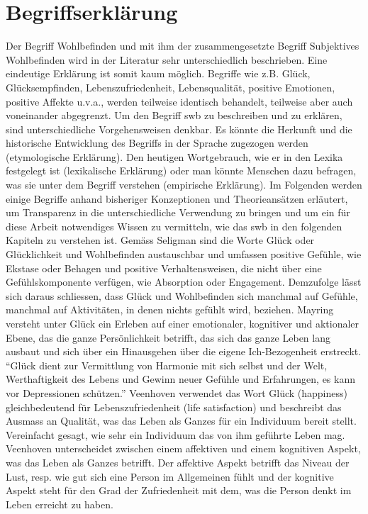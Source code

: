 \section{Begriffserklärung}\label{begriff}
Der Begriff Wohlbefinden und mit ihm der zusammengesetzte Begriff Subjektives Wohlbefinden wird in der Literatur sehr unterschiedlich beschrieben. Eine eindeutige Erklärung ist somit kaum möglich. Begriffe wie z.B. Glück, Glücksempfinden, Lebenszufriedenheit, Lebensqualität, positive Emotionen, positive Affekte u.v.a., werden teilweise identisch behandelt, teilweise aber auch voneinander abgegrenzt. Um den Begriff \gls{swb} zu beschreiben und zu erklären, sind unterschiedliche Vorgehensweisen denkbar. Es könnte die Herkunft und die historische Entwicklung des Begriffs in der Sprache zugezogen werden (etymologische Erklärung). Den heutigen Wortgebrauch, wie er in den Lexika festgelegt ist (lexikalische Erklärung) oder man könnte Menschen dazu befragen, was sie unter dem Begriff verstehen (empirische Erklärung). 
Im Folgenden werden einige Begriffe anhand bisheriger Konzeptionen und Theorieansätzen erläutert, um Transparenz in die unterschiedliche Verwendung zu bringen und um ein für diese Arbeit notwendiges Wissen zu vermitteln, wie das \gls{swb} in den folgenden Kapiteln zu verstehen ist.\newline
Gemäss Seligman  \cite{Seligman:2003} sind die Worte Glück oder Glücklichkeit und Wohlbefinden austauschbar und umfassen positive Gefühle, wie Ekstase oder Behagen und positive Verhaltensweisen, die nicht über eine Gefühlskomponente verfügen, wie Absorption oder Engagement. Demzufolge lässt sich daraus schliessen, dass Glück und Wohlbefinden sich manchmal auf Gefühle, manchmal auf Aktivitäten, in denen nichts gefühlt wird, beziehen.\newline
Mayring \cite{Mayring:1991} versteht unter Glück ein Erleben auf einer emotionaler, kognitiver und aktionaler Ebene, das die ganze Persönlichkeit betrifft, das sich das ganze Leben lang ausbaut und sich über ein Hinausgehen über die eigene Ich-Bezogenheit erstreckt. \textquotedblleft Glück dient zur Vermittlung von Harmonie mit sich selbst und der Welt, Werthaftigkeit des Lebens und Gewinn neuer Gefühle und Erfahrungen, es kann vor Depressionen schützen.\textquotedblright \quad \cite{Mayring:1991} \newline
Veenhoven \cite{Veenhoven:1991} verwendet das Wort Glück (happiness) gleichbedeutend für Lebenszufriedenheit (life satisfaction) und beschreibt das Ausmass an Qualität, was das Leben als Ganzes für ein Individuum bereit stellt. Vereinfacht gesagt, wie sehr ein Individuum das von ihm geführte Leben mag. Veenhoven unterscheidet zwischen einem affektiven und einem kognitiven Aspekt, was das Leben als Ganzes betrifft. Der affektive Aspekt betrifft das Niveau der Lust, resp. wie gut sich eine Person im Allgemeinen fühlt  und der kognitive Aspekt steht für den Grad der Zufriedenheit mit dem, was die Person denkt im Leben erreicht zu haben.\newline
